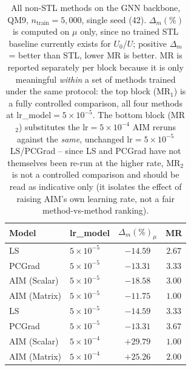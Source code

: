 
\begin{table}[t]
\centering
\caption{All non-STL methods on the GNN backbone, QM9, $n_{\text{train}}=5{,}000$,
single seed (42). $\Delta_m(\%)$ is computed on $\mu$ only, since no trained STL
baseline currently exists for $U_0$/$U$; positive $\Delta_m$ = better than STL,
lower MR is better. MR is reported separately per block because it is only
meaningful \emph{within} a set of methods trained under the same protocol:
the top block (MR$_1$) is a fully controlled comparison, all four methods at
lr\_model$=5\times10^{-5}$. The bottom block (MR$_2$) substitutes the
lr$=5\times10^{-4}$ AIM reruns against the \emph{same}, unchanged lr$=5\times10^{-5}$
LS/PCGrad -- since LS and PCGrad have not themselves been re-run at the higher
rate, MR$_2$ is not a controlled comparison and should be read as indicative
only (it isolates the effect of raising AIM's own learning rate, not a fair
method-vs-method ranking).}
\label{tab:gnn_5k_all_methods}
\begin{tabular}{llcc}
\toprule
Model & lr\_model & $\Delta_m(\%)_{\mu}$ & MR \\
\midrule
LS           & $5\times10^{-5}$ & $-14.59$          & $2.67$ \\
PCGrad       & $5\times10^{-5}$ & $-13.31$          & $3.33$ \\
AIM (Scalar) & $5\times10^{-5}$ & $-18.58$          & $3.00$ \\
AIM (Matrix) & $5\times10^{-5}$ & $\mathbf{-11.75}$ & $\mathbf{1.00}$ \\
\midrule
LS           & $5\times10^{-5}$ & $-14.59$          & $3.33$ \\
PCGrad       & $5\times10^{-5}$ & $-13.31$          & $3.67$ \\
AIM (Scalar) & $5\times10^{-4}$ & $\mathbf{+29.79}$ & $\mathbf{1.00}$ \\
AIM (Matrix) & $5\times10^{-4}$ & $+25.26$          & $2.00$ \\
\bottomrule
\end{tabular}
\end{table}

